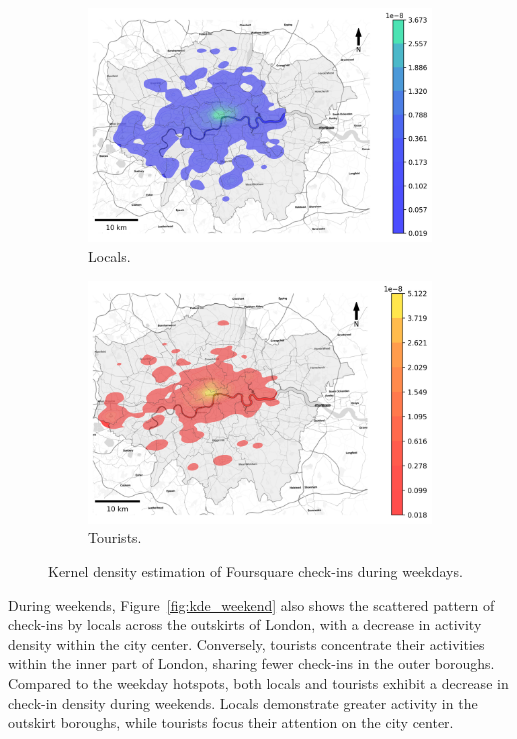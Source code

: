 \documentclass{article}
\theoremstyle{definition}
\theoremstyle{remark}
\begin{document}
\begin{figure}[!h]

\begin{subfigure}{0.5\textwidth}
\includegraphics[width=1\linewidth]{figures/kde_locals_weekday.png} 
\caption{Locals.}
\label{fig:kde_locals_weekday}
\end{subfigure}
\begin{subfigure}{0.5\textwidth}
\includegraphics[width=1\linewidth]{figures/kde_tourists_weekday.png}
\caption{Tourists.}
\label{fig:kde_tourists_weekday}
\end{subfigure}

\caption{Kernel density estimation of Foursquare check-ins during weekdays.} \label{fig:kde_weekday}
\end{figure}

During weekends, Figure~\ref{fig:kde_weekend} also shows the scattered pattern of check-ins by locals across the outskirts of London, with a decrease in activity density within the city center. Conversely, tourists concentrate their activities within the inner part of London, sharing fewer check-ins in the outer boroughs. Compared to the weekday hotspots, both locals and tourists exhibit a decrease in check-in density during weekends. Locals demonstrate greater activity in the outskirt boroughs, while tourists focus their attention on the city center.
\end{document}
